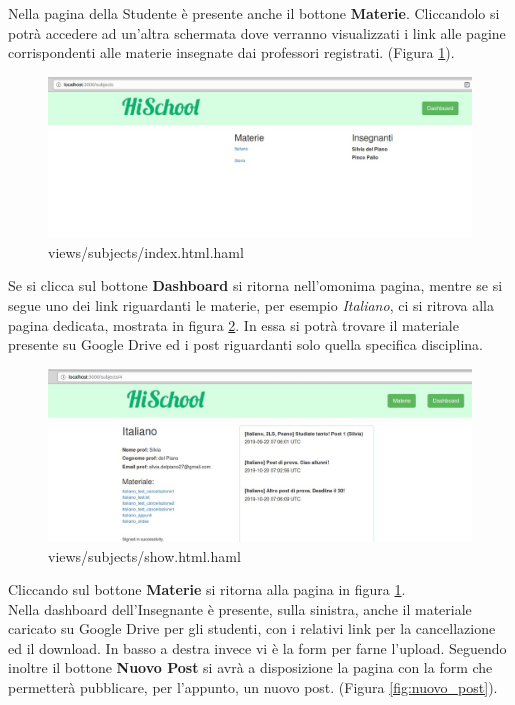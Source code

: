 \documentclass[Lau, binding=0.6cm, oneside]{sapthesis}
\begin{document}
Nella pagina della Studente è presente anche il bottone \textbf{Materie}. Cliccandolo si potrà accedere ad un'altra schermata dove verranno visualizzati i link alle pagine corrispondenti alle materie insegnate dai professori registrati. (Figura \ref{fig:materie_page}).

\begin{figure}[H]
	\centering
	\includegraphics[width=1\linewidth]{images/materie_page} 
	\caption{views/subjects/index.html.haml}
	\label{fig:materie_page}
\end{figure}

Se si clicca sul bottone \textbf{Dashboard} si ritorna nell'omonima pagina, mentre se si segue uno dei link riguardanti le materie, per esempio \textit{Italiano}, ci si ritrova alla pagina dedicata, mostrata in figura \ref{fig:materia_page}. In essa si potrà trovare il materiale presente su Google Drive ed i post riguardanti solo quella specifica disciplina.

\begin{figure}[H]
	\centering
	\includegraphics[width=1\linewidth]{images/materia_page} 
	\caption{views/subjects/show.html.haml}
	\label{fig:materia_page}
\end{figure}

Cliccando sul bottone \textbf{Materie} si ritorna alla pagina in figura \ref{fig:materie_page}.\\

Nella dashboard dell'Insegnante è presente, sulla sinistra, anche il materiale caricato su Google Drive per gli studenti, con i relativi link per la cancellazione ed il download. In basso a destra invece vi è la form per farne l'upload. 
Seguendo inoltre il bottone \textbf{Nuovo Post} si avrà a disposizione la pagina con la form che permetterà pubblicare, per l'appunto, un nuovo post. (Figura \ref{fig:nuovo_post}).\\
\end{document}
